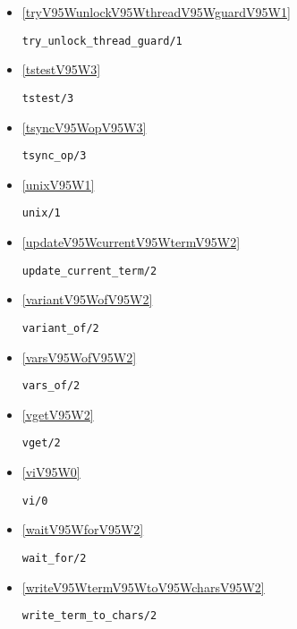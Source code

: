 \begin{itemize}
\item \ref{tryV95WunlockV95WthreadV95WguardV95W1} 
\begin{verbatim}
try_unlock_thread_guard/1
\end{verbatim}

\item \ref{tstestV95W3} 
\begin{verbatim}
tstest/3
\end{verbatim}

\item \ref{tsyncV95WopV95W3} 
\begin{verbatim}
tsync_op/3
\end{verbatim}

\item \ref{unixV95W1} 
\begin{verbatim}
unix/1
\end{verbatim}

\item \ref{updateV95WcurrentV95WtermV95W2} 
\begin{verbatim}
update_current_term/2
\end{verbatim}

\item \ref{variantV95WofV95W2} 
\begin{verbatim}
variant_of/2
\end{verbatim}

\item \ref{varsV95WofV95W2} 
\begin{verbatim}
vars_of/2
\end{verbatim}

\item \ref{vgetV95W2} 
\begin{verbatim}
vget/2
\end{verbatim}

\item \ref{viV95W0} 
\begin{verbatim}
vi/0
\end{verbatim}

\item \ref{waitV95WforV95W2} 
\begin{verbatim}
wait_for/2
\end{verbatim}

\item \ref{writeV95WtermV95WtoV95WcharsV95W2} 
\begin{verbatim}
write_term_to_chars/2
\end{verbatim}


\end{itemize}
